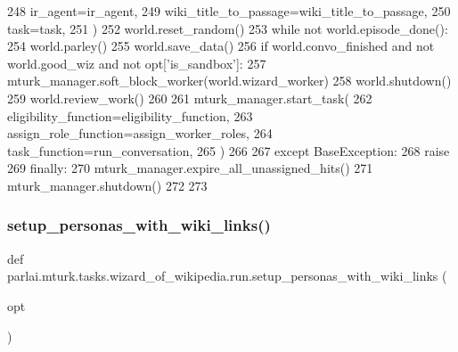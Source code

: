 \begin{DoxyCode}
248                 ir\_agent=ir\_agent,
249                 wiki\_title\_to\_passage=wiki\_title\_to\_passage,
250                 task=task,
251             )
252             world.reset\_random()
253             \textcolor{keywordflow}{while} \textcolor{keywordflow}{not} world.episode\_done():
254                 world.parley()
255             world.save\_data()
256             \textcolor{keywordflow}{if} world.convo\_finished \textcolor{keywordflow}{and} \textcolor{keywordflow}{not} world.good\_wiz \textcolor{keywordflow}{and} \textcolor{keywordflow}{not} opt[\textcolor{stringliteral}{'is\_sandbox'}]:
257                 mturk\_manager.soft\_block\_worker(world.wizard\_worker)
258             world.shutdown()
259             world.review\_work()
260 
261         mturk\_manager.start\_task(
262             eligibility\_function=eligibility\_function,
263             assign\_role\_function=assign\_worker\_roles,
264             task\_function=run\_conversation,
265         )
266 
267     \textcolor{keywordflow}{except} BaseException:
268         \textcolor{keywordflow}{raise}
269     \textcolor{keywordflow}{finally}:
270         mturk\_manager.expire\_all\_unassigned\_hits()
271         mturk\_manager.shutdown()
272 
273 
\end{DoxyCode}
\mbox{\label{namespaceparlai_1_1mturk_1_1tasks_1_1wizard__of__wikipedia_1_1run_a5c16caa932230f93c418facd793be473}} 
\subsubsection{\texorpdfstring{setup\+\_\+personas\+\_\+with\+\_\+wiki\+\_\+links()}{setup\_personas\_with\_wiki\_links()}}
{\footnotesize\ttfamily def parlai.\+mturk.\+tasks.\+wizard\+\_\+of\+\_\+wikipedia.\+run.\+setup\+\_\+personas\+\_\+with\+\_\+wiki\+\_\+links (\begin{DoxyParamCaption}\item[{}]{opt }\end{DoxyParamCaption})}



